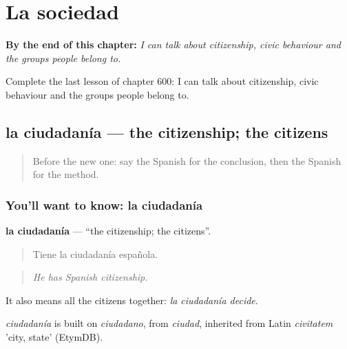 
\chapter{La sociedad}
\label{ch:es-la-sociedad}

\begin{chapteropening}
\textbf{By the end of this chapter:} \emph{I can talk about citizenship, civic behaviour and the groups people belong to.}

Complete the last lesson of chapter 600: I can talk about citizenship, civic behaviour and the groups people belong to.
\end{chapteropening}

\section[la ciudadanía]{la ciudadanía — the citizenship; the citizens}

\label{lesson:ES-C600-ciudadania}



\begin{quote}
Before the new one: say the Spanish for the conclusion, then the Spanish for the method.
\end{quote}

\subsection*{You'll want to know: la ciudadanía}
\textbf{la ciudadanía} — \textquotedblleft{}the citizenship; the citizens\textquotedblright{}.

\begin{quote}
Tiene la ciudadanía española.
\end{quote}

\begin{quote}
\emph{He has Spanish citizenship.}
\end{quote}

It also means all the citizens together: \emph{la ciudadanía decide}.

\begin{cousinweb}
\emph{ciudadanía} is built on \emph{ciudadano}, from \emph{ciudad}, inherited from Latin \emph{civitatem} 'city, state' (EtymDB).
\end{cousinweb}

